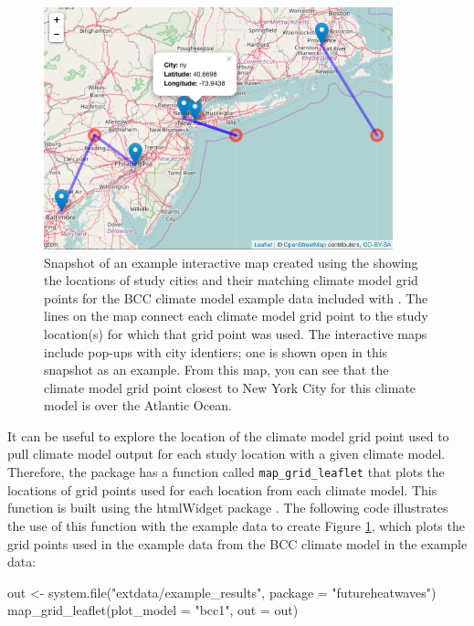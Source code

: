 \begin{figure}
\begin{center}
\includegraphics[width = 0.9\textwidth]{ExampleLeaflet}
\end{center}
\caption{Snapshot of an example interactive map created using the  showing the locations of study cities and their matching climate model grid points for the BCC climate model example data included with . The lines on the map connect each climate model grid point to the study location(s) for which that grid point was used. The interactive maps include pop-ups with city identiers; one is shown open in this snapshot as an example. From this map, you can see that the climate model grid point closest to New York City for this climate model is over the Atlantic Ocean.}
\label{fig:gridmap}
\end{figure}

It can be useful to explore the location of the climate model grid point
used to pull climate model output for each study location with a given
climate model. Therefore, the package has a function called
\texttt{map\_grid\_leaflet} that plots the locations of grid points used
for each location from each climate model. This function is built using
the htmlWidget  package \citep{leaflet}. The following code
illustrates the use of this function with the example data to create
Figure \ref{fig:gridmap}, which plots the grid points used in the
example data from the BCC climate model in the example data:

\begin{Schunk}
\begin{Sinput}
out <- system.file("extdata/example_results", package = "futureheatwaves")
map_grid_leaflet(plot_model = "bcc1", out = out)
\end{Sinput}
\end{Schunk}

